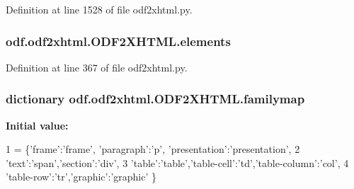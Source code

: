 Definition at line 1528 of file odf2xhtml.\+py.

\hypertarget{classodf_1_1odf2xhtml_1_1ODF2XHTML_ab06ecdbc49f7f31d3c5274cb612af4e6}{
\subsubsection[{elements}]{\setlength{\rightskip}{0pt plus 5cm}odf.\+odf2xhtml.\+O\+D\+F2\+X\+H\+T\+M\+L.\+elements}}\label{classodf_1_1odf2xhtml_1_1ODF2XHTML_ab06ecdbc49f7f31d3c5274cb612af4e6}


Definition at line 367 of file odf2xhtml.\+py.

\hypertarget{classodf_1_1odf2xhtml_1_1ODF2XHTML_ab9f1f2aaedcd6762d8c0c5eaf734d435}{
\subsubsection[{familymap}]{\setlength{\rightskip}{0pt plus 5cm}dictionary odf.\+odf2xhtml.\+O\+D\+F2\+X\+H\+T\+M\+L.\+familymap\hspace{0.3cm}{\ttfamily [static]}}}\label{classodf_1_1odf2xhtml_1_1ODF2XHTML_ab9f1f2aaedcd6762d8c0c5eaf734d435}
{\bfseries Initial value\+:}
\begin{DoxyCode}
1 = \{\textcolor{stringliteral}{'frame'}:\textcolor{stringliteral}{'frame'}, \textcolor{stringliteral}{'paragraph'}:\textcolor{stringliteral}{'p'}, \textcolor{stringliteral}{'presentation'}:\textcolor{stringliteral}{'presentation'},
2         \textcolor{stringliteral}{'text'}:\textcolor{stringliteral}{'span'},\textcolor{stringliteral}{'section'}:\textcolor{stringliteral}{'div'},
3         \textcolor{stringliteral}{'table'}:\textcolor{stringliteral}{'table'},\textcolor{stringliteral}{'table-cell'}:\textcolor{stringliteral}{'td'},\textcolor{stringliteral}{'table-column'}:\textcolor{stringliteral}{'col'},
4         \textcolor{stringliteral}{'table-row'}:\textcolor{stringliteral}{'tr'},\textcolor{stringliteral}{'graphic'}:\textcolor{stringliteral}{'graphic'} \}
\end{DoxyCode}



